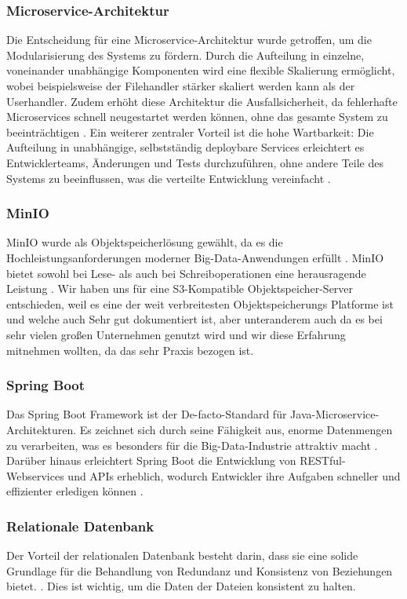 \documentclass[12pt]{report}
\begin{document}
			\subsubsection{Microservice-Architektur}
			Die Entscheidung für eine Microservice-Architektur wurde getroffen, um die Modularisierung des Systems zu fördern. Durch die Aufteilung in einzelne, voneinander unabhängige Komponenten wird eine flexible Skalierung ermöglicht, wobei beispielsweise der Filehandler stärker skaliert werden kann als der Userhandler. Zudem erhöht diese Architektur die Ausfallsicherheit, da fehlerhafte Microservices schnell neugestartet werden können, ohne das gesamte System zu beeinträchtigen \cite{taibi2017processes}. Ein weiterer zentraler Vorteil ist die hohe Wartbarkeit: Die Aufteilung in unabhängige, selbstständig deploybare Services erleichtert es Entwicklerteams, Änderungen und Tests durchzuführen, ohne andere Teile des Systems zu beeinflussen, was die verteilte Entwicklung vereinfacht \cite{de2019monolithic}.
			
			\subsubsection{MinIO}
			MinIO wurde als Objektspeicherlösung gewählt, da es die Hochleistungsanforderungen moderner Big-Data-Anwendungen erfüllt \cite{makris2022performiance}. MinIO bietet sowohl bei Lese- als auch bei Schreiboperationen eine herausragende Leistung \cite{makris2022performance}. Wir haben uns für eine S3-Kompatible Objektspeicher-Server entschieden, weil es eine der weit verbreitesten Objektspeicherungs Platforme ist und welche auch Sehr gut dokumentiert ist, aber unteranderem auch da es bei sehr vielen großen Unternehmen genutzt wird und wir diese Erfahrung mitnehmen wollten, da das sehr Praxis bezogen ist.
			
			\subsubsection{Spring Boot}
			Das Spring Boot Framework ist der De-facto-Standard für Java-Microservice-Architekturen. Es zeichnet sich durch seine Fähigkeit aus, enorme Datenmengen zu verarbeiten, was es besonders für die Big-Data-Industrie attraktiv macht \cite{mythily2022analysis}. Darüber hinaus erleichtert Spring Boot die Entwicklung von RESTful-Webservices und APIs erheblich, wodurch Entwickler ihre Aufgaben schneller und effizienter erledigen können \cite{mythily2022analysis}.
			
			\subsubsection{Relationale Datenbank}
			Der Vorteil der relationalen Datenbank besteht darin, dass sie eine solide Grundlage für die Behandlung von Redundanz und Konsistenz von Beziehungen bietet. \cite{codd1970relational}. Dies ist wichtig, um die Daten der Dateien konsistent zu halten. 
			
\end{document}
